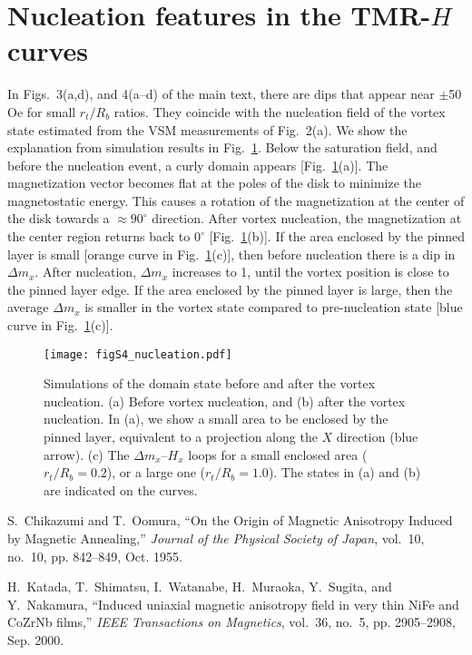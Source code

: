 \section{Nucleation features in the TMR-$H$ curves}
{In Figs.~3(a,d), and 4(a--d) of the main text, there are dips that appear near $\pm$50 Oe for small $r_t/R_b$ ratios. They coincide with the nucleation field of the vortex state estimated from the VSM measurements of Fig.~2(a). We show the explanation from simulation results in Fig.~\ref{fig:sup_nuc}. Below the saturation field, and before the nucleation event, a curly domain appears [Fig.~\ref{fig:sup_nuc}(a)]. The magnetization vector becomes flat at the poles of the disk to minimize the magnetostatic energy. This causes a rotation of the magnetization at the center of the disk towards a $\approx 90^\circ$ direction. After vortex nucleation, the magnetization at the center region returns back to $0^\circ$ [Fig.~\ref{fig:sup_nuc}(b)]. If the area enclosed by the pinned layer is small  [orange curve in Fig.~\ref{fig:sup_nuc}(c)], then before nucleation there is a dip in $\Delta m_x$. After nucleation, $\Delta m_x$ increases to 1, until the vortex position is close to the pinned layer edge. If the area enclosed by the pinned layer is large, then the average $\Delta m_x$ is smaller in the vortex state compared to pre-nucleation state [blue curve in Fig.~\ref{fig:sup_nuc}(c)]. }

\begin{figure}[hb]
 \begin{center}
     \texttt{[image: figS4\_nucleation.pdf]}
    \caption{Simulations of the domain state before and after the vortex nucleation. (a) Before vortex nucleation, and (b) after the vortex nucleation. In (a), we show a small area to be enclosed by the pinned layer, equivalent to a projection along the $X$ direction (blue arrow). (c) The $\Delta m_x$--$H_x$ loops for a small enclosed area ($r_t/R_b = 0.2$), or a large one ($r_t/R_b = 1.0$). The states in (a) and (b) are indicated on the curves. }
    \label{fig:sup_nuc}
 \end{center}
\end{figure}


\begin{thebibliography}{1}
    S.~Chikazumi and T.~Oomura, ``On the {{Origin}} of {{Magnetic Anisotropy
      Induced}} by {{Magnetic Annealing}},'' \emph{Journal of the Physical Society
      of Japan}, vol.~10, no.~10, pp. 842--849, Oct. 1955.
    
    H.~Katada, T.~Shimatsu, I.~Watanabe, H.~Muraoka, Y.~Sugita, and Y.~Nakamura,
      ``Induced uniaxial magnetic anisotropy field in very thin {{NiFe}} and
      {{CoZrNb}} films,'' \emph{IEEE Transactions on Magnetics}, vol.~36, no.~5,
      pp. 2905--2908, Sep. 2000.

\end{thebibliography}